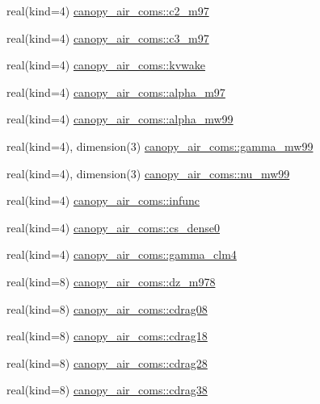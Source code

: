 \begin{DoxyCompactItemize}
\item 
real(kind=4) \hyperlink{namespacecanopy__air__coms_a47dcf89394a1ea827c110b9ceb601b79}{canopy\+\_\+air\+\_\+coms\+::c2\+\_\+m97}
\item 
real(kind=4) \hyperlink{namespacecanopy__air__coms_a40fc08a843524cc8b4e05ba8766cb930}{canopy\+\_\+air\+\_\+coms\+::c3\+\_\+m97}
\item 
real(kind=4) \hyperlink{namespacecanopy__air__coms_a54402456387b824df174f09157236866}{canopy\+\_\+air\+\_\+coms\+::kvwake}
\item 
real(kind=4) \hyperlink{namespacecanopy__air__coms_ac16bf823a6fc81f0d671fa06ca5de7e7}{canopy\+\_\+air\+\_\+coms\+::alpha\+\_\+m97}
\item 
real(kind=4) \hyperlink{namespacecanopy__air__coms_aee71b7396b4019638189e8d16f29d5bc}{canopy\+\_\+air\+\_\+coms\+::alpha\+\_\+mw99}
\item 
real(kind=4), dimension(3) \hyperlink{namespacecanopy__air__coms_a80914f4f0e8ab35603807486ea39940e}{canopy\+\_\+air\+\_\+coms\+::gamma\+\_\+mw99}
\item 
real(kind=4), dimension(3) \hyperlink{namespacecanopy__air__coms_aa50afa7c99107797c84ed294a6215584}{canopy\+\_\+air\+\_\+coms\+::nu\+\_\+mw99}
\item 
real(kind=4) \hyperlink{namespacecanopy__air__coms_aaf5736b1a385a45d4fb74b566c63c036}{canopy\+\_\+air\+\_\+coms\+::infunc}
\item 
real(kind=4) \hyperlink{namespacecanopy__air__coms_aa5644ca796e2926f845d04ce805b9d9c}{canopy\+\_\+air\+\_\+coms\+::cs\+\_\+dense0}
\item 
real(kind=4) \hyperlink{namespacecanopy__air__coms_a5488ab681543df43e05f68b3647184ec}{canopy\+\_\+air\+\_\+coms\+::gamma\+\_\+clm4}
\item 
real(kind=8) \hyperlink{namespacecanopy__air__coms_a651fd5632f3589ad9cd58b3f6eaf5bcc}{canopy\+\_\+air\+\_\+coms\+::dz\+\_\+m978}
\item 
real(kind=8) \hyperlink{namespacecanopy__air__coms_af3d9254c2bae93060644975c43abb36c}{canopy\+\_\+air\+\_\+coms\+::cdrag08}
\item 
real(kind=8) \hyperlink{namespacecanopy__air__coms_ac953582df4052a2a3539e145f2407c50}{canopy\+\_\+air\+\_\+coms\+::cdrag18}
\item 
real(kind=8) \hyperlink{namespacecanopy__air__coms_ab8484a0111b4ddc92040d0c269e66f3a}{canopy\+\_\+air\+\_\+coms\+::cdrag28}
\item 
real(kind=8) \hyperlink{namespacecanopy__air__coms_ab2603251a0323d37d22ea19a30371dbb}{canopy\+\_\+air\+\_\+coms\+::cdrag38}

\end{DoxyCompactItemize}
